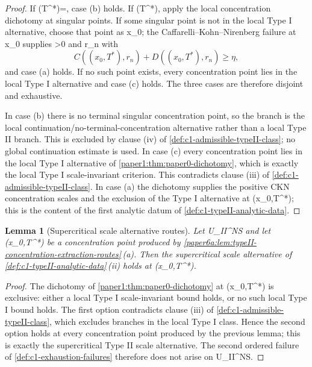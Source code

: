 \documentclass[11pt]{amsart}
\def\({}%
\def\){}%
\def\mathrm#1{#1}%
\theoremstyle{plain}
\newtheorem{lemma}[lemma]{Lemma}
\theoremstyle{definition}
\theoremstyle{remark}
\begin{document}
\begin{proof}
If \(\Sigma(T^*)=\emptyset\), case \textup{(b)} holds.  If
\(\Sigma(T^*)\ne\emptyset\), apply the local concentration dichotomy at
singular points.  If some singular point is not in the local Type I
alternative, choose that point as \(x_0\); the Caffarelli--Kohn--Nirenberg
failure at \(x_0\) supplies \(\eta>0\) and \(r_n\) with
\[
  C((x_0,T^*),r_n)+D((x_0,T^*),r_n)\ge\eta,
\]
and case \textup{(a)} holds.  If no such point exists, every concentration
point lies in the local Type I alternative and case \textup{(c)} holds.  The
three cases are therefore disjoint and exhaustive.

In case \textup{(b)} there is no terminal singular concentration point, so the
branch is the local continuation/no-terminal-concentration alternative rather
than a local Type II branch.  This is excluded by clause \textup{(iv)} of
\cref{def:c1-admissible-typeII-class}; no global continuation estimate is used.
In case \textup{(c)} every concentration point lies in the local Type I
alternative of \cref{paper1:thm:paper0-dichotomy}, which is exactly the local
Type I scale-invariant criterion.  This contradicts clause \textup{(iii)} of
\cref{def:c1-admissible-typeII-class}.  In case \textup{(a)} the dichotomy
supplies the positive CKN concentration scales and the exclusion of the Type I
alternative at \((x_0,T^*)\); this is the content of the first analytic datum of
\cref{def:c1-typeII-analytic-data}.
\end{proof}

\begin{lemma}[Supercritical scale alternative routes]
\label{paper6a:lem:typeII-scale-alternative-routes}
Let \(\omega\in\mathcal U_{\mathrm{II}}^{NS}\) and let \((x_0,T^*)\) be a
concentration point produced by
\cref{paper6a:lem:typeII-concentration-extraction-routes}\,\textup{(a)}.
Then the supercritical scale alternative of
\cref{def:c1-typeII-analytic-data}\,\textup{(ii)} holds at \((x_0,T^*)\).
\end{lemma}

\begin{proof}
The dichotomy of \cref{paper1:thm:paper0-dichotomy} at \((x_0,T^*)\) is
exclusive: either a local Type I scale-invariant bound holds, or no such
local Type I bound holds.  The first option contradicts clause \textup{(iii)}
of \cref{def:c1-admissible-typeII-class}, which excludes branches in the
local Type I class.  Hence the second option holds at every concentration
point produced by the previous lemma; this is exactly the supercritical
Type II scale alternative.  The second ordered failure of
\cref{def:c1-exhaustion-failures} therefore does not arise on
\(\mathcal U_{\mathrm{II}}^{NS}\).
\end{proof}
\end{document}
